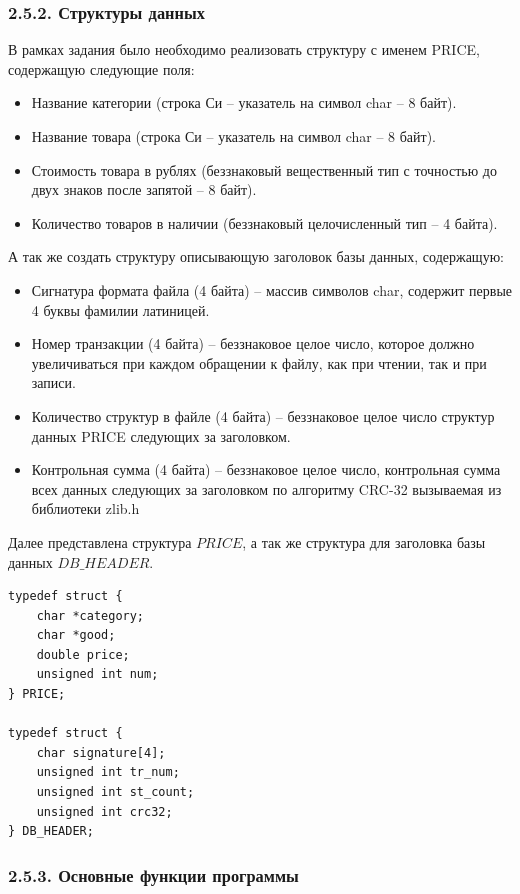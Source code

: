 \documentclass[14pt]{extreport}
\begin{document}
{\subsubsection*{2.5.2. Структуры данных}

В рамках задания было необходимо реализовать структуру с именем PRICE, содержащую следующие поля:
\begin{itemize}
    \item Название категории (строка Си -- указатель на символ char -- 8 байт).
    \item Название товара (строка Си -- указатель на символ char -- 8 байт).
    \item Стоимость товара в рублях (беззнаковый вещественный тип с точностью до двух знаков после запятой -- 8 байт).
    \item Количество товаров в наличии (беззнаковый целочисленный тип -- 4 байта).
\end{itemize}

А так же создать структуру описывающую заголовок базы данных, содержащую:
\begin{itemize}
	\item Сигнатура формата файла (4 байта) -- массив символов char, содержит первые 4 буквы фамилии латиницей.
	\item Номер транзакции (4 байта) -- беззнаковое целое число, которое должно увеличиваться при каждом обращении к файлу, как при чтении, так и при записи.
	\item Количество структур в файле (4 байта) -- беззнаковое целое число структур данных PRICE следующих за заголовком.
	\item Контрольная сумма (4 байта) -- беззнаковое целое число, контрольная сумма всех данных следующих за заголовком по алгоритму CRC-32 вызываемая из библиотеки zlib.h
\end{itemize}

Далее представлена структура $PRICE$, а так же структура для заголовка базы данных $DB\_HEADER$.
\begin{verbatim}
typedef struct {
    char *category;   
    char *good;      
    double price;     
    unsigned int num; 
} PRICE;

typedef struct {
    char signature[4];
    unsigned int tr_num;
    unsigned int st_count; 
    unsigned int crc32; 
} DB_HEADER;
\end{verbatim}

\subsubsection*{2.5.3. Основные функции программы}

}
\end{document}
